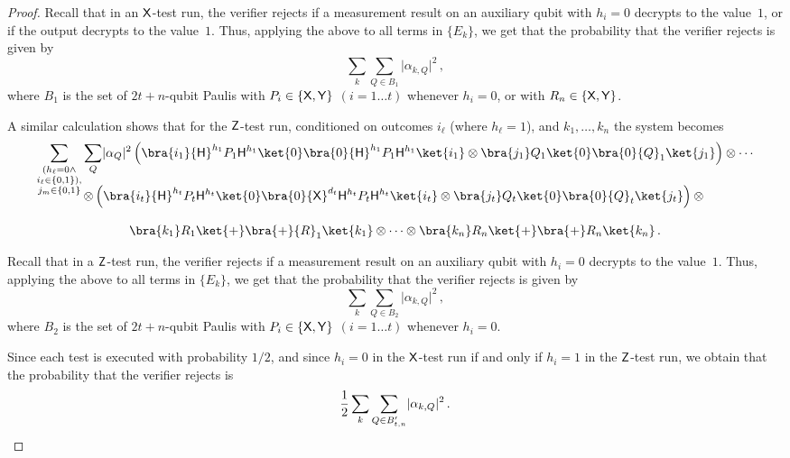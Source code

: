\documentclass{toc}
\newcommand{\hgate}{{\sf H}}
\newcommand{\xgate}{{\sf X}}
\newcommand{\ygate}{{\sf Y}}
\newcommand{\zgate}{{\sf Z}}
\providecommand{\abs}[1]{\lvert#1\rvert}
\newcommand{\ketbra}[2]{\ket{#1}\bra{#2}}			%
\newcommand{\egoketbra}[1]{\ketbra{#1}{#1}}			%
\begin{document}
\begin{proof}
Recall that in an $\xgate$-test run, the verifier rejects if a measurement result on an auxiliary qubit with $h_i=0$ decrypts to the value~$1$, or if the output decrypts to the value~$1$. Thus, applying the above to all terms in $\{E_k\}$, we get that  the probability that the verifier rejects is given by
\begin{equation}
  \sum_k\sum_{Q \in B_1}\abs{\alpha_{k,Q}}^2\,,
\end{equation}
where $B_1$ is the set of $2t+n$-qubit Paulis with
$P_i \in \{\xgate, \ygate\}$ $(i = 1\ldots t)$ whenever $h_i =0$, or
with $R_n \in \{\xgate, \ygate\}$.

A similar calculation shows that for the $\zgate$-test run,
conditioned on outcomes $i_\ell$ (where $h_\ell =1$), and
   $k_1, \ldots ,k_n$ the system becomes%
\begin{multline}
\sum_{\substack{(h_\ell=0 \wedge \\  i_\ell \in \{0,1\}), \\
j_m \in \{0,1\}}} \sum_{Q} \abs{\alpha_Q}^2
 \left( \bra{i_1} \hgate^{h_1} P_1 \hgate^{h_1}  \egoketbra{0}  {\hgate}^{h_1} {P}_1 {\hgate}^{h_1}  \ket{i_1} \otimes
\bra{j_1}  Q_1  \egoketbra{0}  {Q}_1  \ket{j_1} \right) \otimes  \cdots  \\[-3ex]
   \otimes  \left(  \bra{i_t}  \hgate^{h_t}  P_t \hgate^{h_t}     \egoketbra{0} \xgate^{d_t} {\hgate}^{h_t}  {P}_t {\hgate}^{h_t}  \ket{i_t}  \otimes \bra{j_t}   Q_t   \egoketbra{0}  {Q}_t  \ket{j_t} \right)
\otimes  {}\\[2ex]\bra{k_1} R_1  \egoketbra{+} {R}_1  \ket{k_1} \otimes \cdots \otimes \bra{k_n}   R_n \egoketbra{+}  R_n  \ket{k_n}\,.
\end{multline}

Recall that in a $\zgate$-test run, the verifier rejects if a measurement result on an auxiliary qubit with $h_i=0$ decrypts to the value~$1$.
Thus, applying the above to all terms in $\{E_k\}$, we get that the probability that the verifier rejects is given by
\begin{equation}
  \sum_k\sum_{Q \in B_2}\abs{\alpha_{k,Q}}^2\,,
\end{equation}
where $B_2$ is the set of $2t+n$-qubit Paulis with
$P_i \in \{\xgate, \ygate\}$ $(i = 1\ldots t)$ whenever $h_i =0$.
%

Since each test is executed  with probability ${1}/{2}$, and since  $h_i = 0$ in the $\xgate$-test run if and only if $h_i =1$ in the $\zgate$-test run, we obtain that the
probability that the verifier rejects is%
\begin{equation}
\frac{1}{2} \sum_k\sum_{Q \in B'_{t,n}} \abs{\alpha_{k,Q}}^2\,. \qedhere
\end{equation}
 \end{proof}
\end{document}
